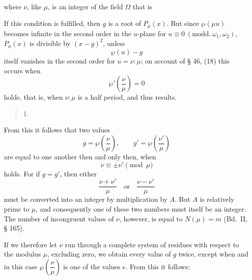 
where $\nu$, like $\mu$, is an integer of the field $\Omega$ that is 

If this condition is fulfilled, then $g$ is a root of $P_\mu(x)$. But since $\wp(\mu u)$ becomes infinite in the second order in the $u$-plane for $u\equiv 0\ (\mathrm{modd}.\ \omega_1,\omega_2)$, $P_\mu(x)$ is divisible by $(x-g)^2$, unless
\[ \wp(u) - g \]
itself vanishes in the second order for $u=\nu:\mu$; on account of § 46, (18) this occurs when
\[ \wp'\left(\dfrac{\nu}{\mu}\right) = 0 \]
holds, that is, when $\nu:\mu$ is a half period, and thus
results.

\begin{quote}
{\small 1. }
\end{quote}

From this it follows that two values
\[ g = \wp\left(\dfrac{\nu}{\mu}\right), \qquad g' = \wp\left(\dfrac{\nu'}{\mu}\right) \]
are equal to one another then and only then, when
\[ \nu \equiv \pm \nu' \pmod{\mu} \]
holds. For if $g=g'$, then either
\[ \dfrac{\nu+\nu'}{\mu} \quad \text{or} \quad \dfrac{\nu-\nu'}{\mu} \]
must be converted into an integer by multiplication by $A$. But $A$ is relatively prime to $\mu$, and consequently one of these two numbers must itself be an integer. The number of incongruent values of $\nu$, however, is equal to $N(\mu) = m$ (Bd.\ II, § 165).

If we therefore let $\nu$ run through a complete system of residues with respect to the modulus $\mu$, excluding zero, we obtain every value of $g$ twice, except when
and in this case $\wp\left(\dfrac{\nu}{\mu}\right)$ is one of the values $e$. From this it follows:
